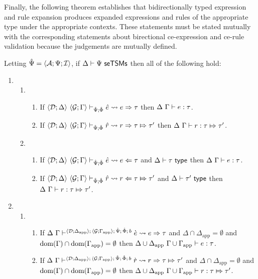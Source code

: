 Finally, the following theorem establishes that bidirectionally typed expression and rule expansion produces expanded expressions and rules of the appropriate type under the appropriate contexts. These statements must be stated mutually with the corresponding statements about birectional ce-expression and ce-rule validation because the judgements are mutually defined. 

\begin{theorem} Letting $\hat{\Psi}=\langle \mathcal{A}; \Psi; \mathcal{I} \rangle$, if $\Delta \vdash \Psi~\mathsf{seTSMs}$ then all of the following hold:
\begin{enumerate}
  \item \begin{enumerate}
    \item \begin{enumerate}
      \item If $\langle \mathcal{D}; \Delta \rangle~\langle \mathcal{G}; \Gamma \rangle \vdash_{\hat{\Psi}; \hat\Phi} {\hat e} \leadsto e \Rightarrow \tau$ then $\Delta~\Gamma \vdash e : \tau$.
      \item If $\langle \mathcal{D}; \Delta \rangle~\langle \mathcal{G}; \Gamma \rangle \vdash_{\hat{\Psi}; \hat\Phi} \hat{r} \leadsto r \Rightarrow \tau \Mapsto \tau'$  then $\Delta~\Gamma \vdash r : \tau \Mapsto \tau'$.
    \end{enumerate}
    \item \begin{enumerate}
      \item If $\langle \mathcal{D}; \Delta \rangle~\langle \mathcal{G}; \Gamma \rangle \vdash_{\hat{\Psi}; \hat\Phi} {\hat e} \leadsto e \Leftarrow \tau$ and $\Delta \vdash \tau~\mathsf{type}$ then $\Delta~\Gamma \vdash e : \tau$.
      \item If $\langle \mathcal{D}; \Delta \rangle~\langle \mathcal{G}; \Gamma \rangle \vdash_{\hat{\Psi}; \hat\Phi} \hat{r} \leadsto r \Leftarrow \tau \Mapsto \tau'$ and $\Delta \vdash \tau'~\mathsf{type}$ then $\Delta~\Gamma \vdash r : \tau \Mapsto \tau'$.
    \end{enumerate}
  \end{enumerate}
  \item \begin{enumerate}
    \item \begin{enumerate}
      \item If $\Delta~\Gamma \vdash^{\langle \mathcal{D}; \Delta_\text{app} \rangle;\,\langle \mathcal{G}; \Gamma_\text{app} \rangle;\,\hat{\Psi};\,\hat\Phi;\,b} \grave{e} \leadsto e \Rightarrow \tau$ and $\Delta \cap \Delta_\text{app}=\emptyset$ and $\text{dom}(\Gamma) \cap \text{dom}(\Gamma_\text{app})=\emptyset$ then ${\Delta}\cup{\Delta_\text{app}}~{\Gamma}\cup{\Gamma_\text{app}} \vdash e : \tau$. 
      \item If $\Delta~\Gamma \vdash^{\langle \mathcal{D}; \Delta_\text{app} \rangle;\,\langle \mathcal{G}; \Gamma_\text{app} \rangle;\,\hat{\Psi};\,\hat\Phi;\,b} \grave{r} \leadsto r \Rightarrow \tau \Mapsto \tau'$ and $\Delta \cap \Delta_\text{app}=\emptyset$ and $\text{dom}(\Gamma) \cap \text{dom}(\Gamma_\text{app})=\emptyset$ then ${\Delta}\cup{\Delta_\text{app}}~{\Gamma}\cup{\Gamma_\text{app}} \vdash r : \tau \Mapsto \tau'$.

\end{enumerate}
\end{enumerate}
\end{enumerate}
\end{theorem}
